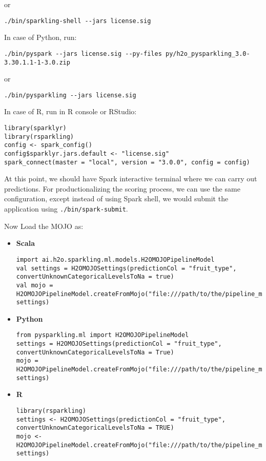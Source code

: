 or

\begin{lstlisting}[style=Bash]
./bin/sparkling-shell --jars license.sig
\end{lstlisting}

In case of Python, run:

\begin{lstlisting}[style=Bash]
./bin/pyspark --jars license.sig --py-files py/h2o_pysparkling_3.0-3.30.1.1-1-3.0.zip
\end{lstlisting}

or

\begin{lstlisting}[style=Bash]
./bin/pysparkling --jars license.sig
\end{lstlisting}

In case of R, run in R console or RStudio:

\begin{lstlisting}[style=R]
library(sparklyr)
library(rsparkling)
config <- spark_config()
config$sparklyr.jars.default <- "license.sig"
spark_connect(master = "local", version = "3.0.0", config = config)
\end{lstlisting}


At this point, we should have Spark interactive terminal where we can carry out predictions.
For productionalizing the scoring process, we can use the same configuration,
except instead of using Spark shell, we would submit the application using \texttt{./bin/spark-submit}.

Now Load the MOJO as:

\begin{itemize}
    \item \textbf{Scala} \begin{lstlisting}[style=Scala]
import ai.h2o.sparkling.ml.models.H2OMOJOPipelineModel
val settings = H2OMOJOSettings(predictionCol = "fruit_type", convertUnknownCategoricalLevelsToNa = true)
val mojo = H2OMOJOPipelineModel.createFromMojo("file:///path/to/the/pipeline_mojo.zip", settings)
    \end{lstlisting}
    \item \textbf{Python} \begin{lstlisting}[style=Python]
from pysparkling.ml import H2OMOJOPipelineModel
settings = H2OMOJOSettings(predictionCol = "fruit_type", convertUnknownCategoricalLevelsToNa = True)
mojo = H2OMOJOPipelineModel.createFromMojo("file:///path/to/the/pipeline_mojo.zip", settings)
    \end{lstlisting}
    \item \textbf{R} \begin{lstlisting}[style=R]
library(rsparkling)
settings <- H2OMOJOSettings(predictionCol = "fruit_type", convertUnknownCategoricalLevelsToNa = TRUE)
mojo <- H2OMOJOPipelineModel.createFromMojo("file:///path/to/the/pipeline_mojo.zip", settings)
    \end{lstlisting}
\end{itemize}

